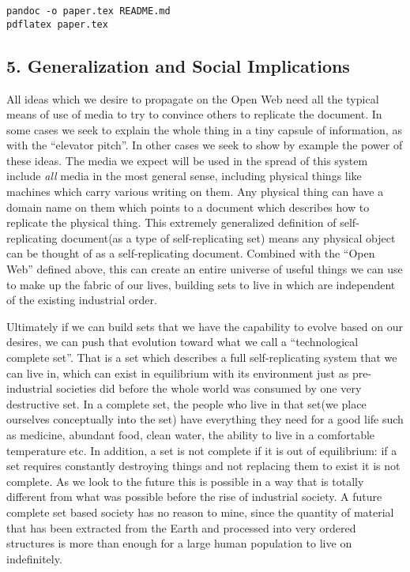 \begin{verbatim}
pandoc -o paper.tex README.md
pdflatex paper.tex
\end{verbatim}

\subsection{5. Generalization and Social
Implications}\label{generalization-and-social-implications}

All ideas which we desire to propagate on the Open Web need all the
typical means of use of media to try to convince others to replicate the
document. In some cases we seek to explain the whole thing in a tiny
capsule of information, as with the ``elevator pitch''. In other cases
we seek to show by example the power of these ideas. The media we expect
will be used in the spread of this system include \emph{all} media in
the most general sense, including physical things like machines which
carry various writing on them. Any physical thing can have a domain name
on them which points to a document which describes how to replicate the
physical thing. This extremely generalized definition of
self-replicating document(as a type of self-replicating set) means any
physical object can be thought of as a self-replicating document.
Combined with the ``Open Web'' defined above, this can create an entire
universe of useful things we can use to make up the fabric of our lives,
building sets to live in which are independent of the existing
industrial order.

Ultimately if we can build sets that we have the capability to evolve
based on our desires, we can push that evolution toward what we call a
``technological complete set''. That is a set which describes a full
self-replicating system that we can live in, which can exist in
equilibrium with its environment just as pre-industrial societies did
before the whole world was consumed by one very destructive set. In a
complete set, the people who live in that set(we place ourselves
conceptually into the set) have everything they need for a good life
such as medicine, abundant food, clean water, the ability to live in a
comfortable temperature etc. In addition, a set is not complete if it is
out of equilibrium: if a set requires constantly destroying things and
not replacing them to exist it is not complete. As we look to the future
this is possible in a way that is totally different from what was
possible before the rise of industrial society. A future complete set
based society has no reason to mine, since the quantity of material that
has been extracted from the Earth and processed into very ordered
structures is more than enough for a large human population to live on
indefinitely.

